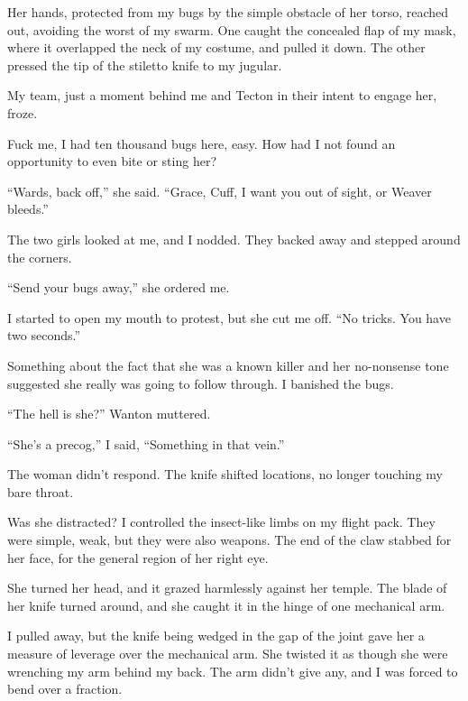 Her hands, protected from my bugs by the simple obstacle of her torso, reached out, avoiding the worst of my swarm.  One caught the concealed flap of my mask, where it overlapped the neck of my costume, and pulled it down.  The other pressed the tip of the stiletto knife to my jugular.



My team, just a moment behind me and Tecton in their intent to engage her, froze.



Fuck me, I had ten thousand bugs here, easy.  How had I not found an opportunity to even bite or sting her?



``Wards, back off,'' she said.  ``Grace, Cuff, I want you out of sight, or Weaver bleeds.''



The two girls looked at me, and I nodded.  They backed away and stepped around the corners.



``Send your bugs away,'' she ordered me.



I started to open my mouth to protest, but she cut me off.  ``No tricks.  You have two seconds.''



Something about the fact that she was a known killer and her no-nonsense tone suggested she really was going to follow through.  I banished the bugs.



``The hell is she?'' Wanton muttered.



``She's a precog,'' I said, ``Something in that vein.''



The woman didn't respond.  The knife shifted locations, no longer touching my bare throat.



Was she distracted?  I controlled the insect-like limbs on my flight pack.  They were simple, weak, but they were also weapons.  The end of the claw stabbed for her face, for the general region of her right eye.



She turned her head, and it grazed harmlessly against her temple.  The blade of her knife turned around, and she caught it in the hinge of one mechanical arm.



I pulled away, but the knife being wedged in the gap of the joint gave her a measure of leverage over the mechanical arm.  She twisted it as though she were wrenching my arm behind my back.  The arm didn't give any, and I was forced to bend over a fraction.



